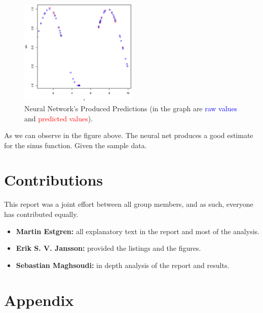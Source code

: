 \documentclass[a4paper, twocolumn]{article}
\begin{document}
    \begin{figure}[h!]
        \centering
        \caption{Neural Network's Produced Predictions (in the graph are \textcolor{blue}{raw values} and \textcolor{red}{predicted values}).}
        \label{fig:predictions}
        \includegraphics[width=0.5\textwidth]{share/predictions.eps}
    \end{figure}
    As we can observe in the figure above. The neural net produces a good estimate for the sinus function. Given the sample data.

    \section*{Contributions}

    This report was a joint effort between all group members, and as such, everyone has contributed equally.
    \begin{itemize}
        \item{\textbf{Martin Estgren:} all explanatory text in the report and most of the analysis.}
        \item{\textbf{Erik S. V. Jansson:} provided the listings and the figures.}
        \item{\textbf{Sebastian Maghsoudi:} in depth analysis of the report and results.}
    \end{itemize}

    \nocite{*} %
    
    
    \onecolumn \appendix
    \section*{Appendix}

    
    
\end{document}
